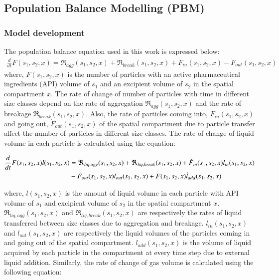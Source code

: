 \documentclass[preprint,11pt,authoryear]{elsarticle}
\begin{document}
\subsection{Population Balance Modelling (PBM)}
\label{sec:pbm_model}
\subsubsection{Model development}
 The population balance equation used in this work is expressed below:
\begin{align}
\frac{d}{dt}F(s_1,s_2,x)=\Re_{agg}(s_1,s_2,x)+\Re_{break}(s_1,s_2,x)+\dot{F}_{in}(s_1,s_2,x)-\dot{F}_{out}(s_1,s_2,x)
\label{eqn:mthds_pbm_overall} 
\end{align}
where, $F(s_1,s_2,x)$ is the number of particles with an active pharmaceutical ingredients (API) volume of $s_1$ and an excipient 
volume of $s_2$ in the spatial compartment $x$. The rate of change of number of particles with time 
in different size classes depend on the rate of aggregation $\Re_{agg}(s_1,s_2,x)$ and the rate of 
breakage $\Re_{break}(s_1,s_2,x)$. Also, the rate of particles coming into, $\dot{F}_{in}(s_1,s_2,x)$ and 
going out, $\dot{F}_{out}(s_1,s_2,x)$ of the spatial compartment due to particle transfer affect the number of 
particles in different size classes. 
The rate of change of liquid volume in each particle is calculated using the equation: 

\begin{align}
\frac{d}{dt}F(s_1,s_2,x)l(s_1,s_2,x)&= 
\Re_{liq,agg}(s_1,s_2,x)+\Re_{liq,break}(s_1,s_2,x)+\dot{F}_{in}(s_1,s_2,x)l_{in}(s_1,s_2,x)\notag\\
&-\dot{F}_{out}(s_1,s_2,x)l_{out}(s_1,s_2,x)+F(s_1,s_2,x)\dot{l}_{add}(s_1,s_2,x)
\label{eqn:mthds_pbm_rate} 
\end{align}

where, $l(s_1,s_2,x)$ is the amount of liquid volume in each particle with API volume of $s_1$ and 
excipient volume of $s_2$ in the spatial compartment $x$. $\Re_{liq,agg}(s_1,s_2,x)$ and 
$\Re_{liq,break}(s_1,s_2,x)$ are respectively the rates of liquid transferred between size classes due to 
aggregation and breakage. $l_{in}(s_1,s_2,x)$ and $l_{out}(s_1,s_2,x)$ are respectively the liquid 
volumes of the particles coming in and going out of the spatial compartment. $l_{add}(s_1,s_2,x)$ is 
the volume of liquid acquired by each particle in the compartment at every time step due to external 
liquid addition.
Similarly, the rate of change of gas volume is calculated using the following equation: 
\end{document}
